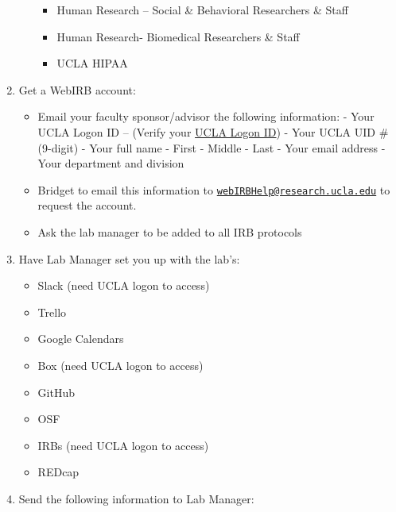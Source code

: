 \documentclass[]{book}
\providecommand{\tightlist}{%
  \setlength{\itemsep}{0pt}\setlength{\parskip}{0pt}}
\begin{document}
\begin{enumerate}
\begin{itemize}
    \begin{itemize}
    \tightlist
    \item
      Human Research -- Social \& Behavioral Researchers \& Staff
    \item
      Human Research- Biomedical Researchers \& Staff
    \item
      UCLA HIPAA
    \end{itemize}
  \end{itemize}
\item
  Get a WebIRB account:

  \begin{itemize}
  \tightlist
  \item
    Email your faculty sponsor/advisor the following information:
    - Your UCLA Logon ID -- (Verify your \href{https://accounts.iam.ucla.edu/lookup}{UCLA Logon ID})
    - Your UCLA UID \# (9-digit)
    - Your full name
    - First
    - Middle
    - Last
    - Your email address
    - Your department and division
  \item
    Bridget to email this information to \href{mailto:webIRBHelp@research.ucla.edu}{\nolinkurl{webIRBHelp@research.ucla.edu}} to request the account.
  \item
    Ask the lab manager to be added to all IRB protocols
  \end{itemize}
\item
  Have Lab Manager set you up with the lab's:

  \begin{itemize}
  \tightlist
  \item
    Slack (need UCLA logon to access)
  \item
    Trello
  \item
    Google Calendars
  \item
    Box (need UCLA logon to access)
  \item
    GitHub
  \item
    OSF
  \item
    IRBs (need UCLA logon to access)
  \item
    REDcap
  \end{itemize}
\item
  Send the following information to Lab Manager:


\end{enumerate}
\end{document}
